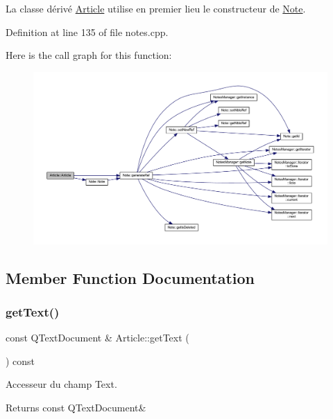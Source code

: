 La classe dérivé \hyperlink{class_article}{Article} utilise en premier lieu le constructeur de \hyperlink{class_note}{Note}. 

Definition at line 135 of file notes.\+cpp.

Here is the call graph for this function\+:\nopagebreak
\begin{figure}[H]
\begin{center}
\leavevmode
\includegraphics[width=350pt]{class_article_af3f6b98ba3cc46aaa5625a17266eb67f_cgraph}
\end{center}
\end{figure}


\subsection{Member Function Documentation}
\mbox{\label{class_article_a178a250fddb6c30288d893f4f3439ca8}} 
\subsubsection{\texorpdfstring{get\+Text()}{getText()}}
{\footnotesize\ttfamily const Q\+Text\+Document \& Article\+::get\+Text (\begin{DoxyParamCaption}{ }\end{DoxyParamCaption}) const\hspace{0.3cm}{\ttfamily [inline]}}



Accesseur du champ Text. 

\begin{DoxyReturn}{Returns}
const Q\+Text\+Document\& 
\end{DoxyReturn}


